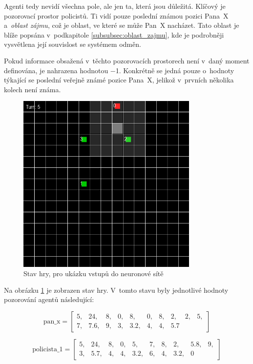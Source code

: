 Agenti tedy nevidí všechna pole, ale jen ta, která jsou důležitá.
Klíčový je pozorovací prostor policistů.
Ti vidí pouze poslední známou pozici Pana~X a~\emph{oblast zájmu}, což je oblast, ve které se může Pan~X nacházet.
Tato oblast je blíže popsána v~podkapitole  \ref{subsubsec:oblast_zajmu}, kde je podrobněji vysvětlena její souvislost se systémem odměn.

Pokud informace obsažená v~těchto pozorovacích prostorech není v~daný moment definována, je nahrazena hodnotou $\minus$1.
Konkrétně se jedná pouze o~hodnoty týkající se poslední veřejně známé pozice Pana~X, jelikož v~prvních několika kolech není známa.

\begin{figure}[H]
	\centering
	\includegraphics[width=0.8\textwidth]{obrazky-figures/game_inputs}
      \caption{Stav hry, pro ukázku vstupů do neuronové sítě}
    \label{fig:game_input}
\end{figure}
Na obrázku \ref{fig:game_input} je zobrazen stav hry.
V~tomto stavu byly jednotlivé hodnoty pozorování agentů následující:

\[
\text{pan\_x} = \begin{bmatrix}
5, & 24, & 8, & 0, & 8, & 0, & 8, & 2, & 2, & 5, \\
7, & 7.6, & 9, & 3, & 3.2, & 4, & 4, & 5.7
\end{bmatrix}
\]

\[
\text{policista\_1} = \begin{bmatrix}
5, & 24, & 8, & 0, & 5, & 7, & 8, & 2, & 5.8, & 9, \\
3, & 5.7, & 4, & 4, & 3.2, & 6, & 4, & 3.2, & 0
\end{bmatrix}
\]

